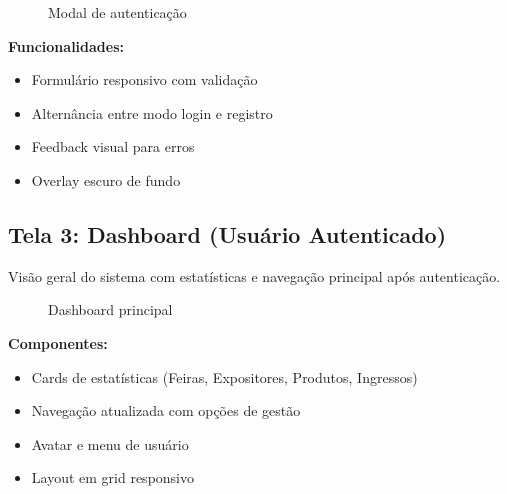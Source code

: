 \documentclass[12pt,a4paper]{article}
\begin{document}
\begin{figure}[H]
\centering
{}
\caption{Modal de autenticação}
\label{fig:modal_login}
\end{figure}

\textbf{Funcionalidades:}
\begin{itemize}
    \item Formulário responsivo com validação
    \item Alternância entre modo login e registro
    \item Feedback visual para erros
    \item Overlay escuro de fundo
\end{itemize}

\subsection{Tela 3: Dashboard (Usuário Autenticado)}

Visão geral do sistema com estatísticas e navegação principal após autenticação.

\begin{figure}[H]
\centering
{}
\caption{Dashboard principal}
\label{fig:dashboard}
\end{figure}

\textbf{Componentes:}
\begin{itemize}
    \item Cards de estatísticas (Feiras, Expositores, Produtos, Ingressos)
    \item Navegação atualizada com opções de gestão
    \item Avatar e menu de usuário
    \item Layout em grid responsivo
\end{itemize}
\end{document}
